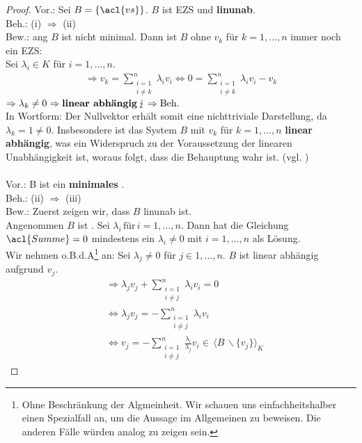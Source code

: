 \begin{proof}  
Vor.: Sei $B = \{\acl{vs}\}$. $B$ ist \acl{EZS} und \textbf{\acl{linunab}}.
\\ Beh.: (i) $\Rightarrow$ (ii) 
\\ Bew.: \acl{ang} $B$ ist nicht minimal. Dann ist $B$ ohne $v_k$ für $k=1,...,n$ immer noch ein \acl{EZS}:
\\ Sei $\lambda_i \in K$ für $i=1,...,n$.
\begin{align*}\Rightarrow v_k = \sum \limits_{\substack{i=1\\i\not=k}}^{n}\lambda_i v_i
\Leftrightarrow 0 = \sum \limits_{\substack{i=1\\i\not=k}}^{n}\lambda_i v_i - v_k 
\end{align*}
\(\Rightarrow \lambda_k \not= 0 \Rightarrow \text{\textbf{linear abhängig}} \, \lightning
\Rightarrow \text{Beh.} \)
\\In Wortform: Der Nullvektor erhält somit eine nichttriviale Darstellung, da $\lambda_k=1\not=0$. Insbesondere ist das System $B$ mit $v_k$ für $k=1,...,n$ \textbf{linear abhängig}, was ein Widerspruch zu der Voraussetzung der linearen Unabhängigkeit ist, woraus folgt, dass die Behauptung wahr ist. (vgl. \cite[S. 41, 9.16 (a) $\Rightarrow$ (b)]{Skript})
\\
\\ Vor.: B ist ein \textbf{minimales }.
\\ Beh.: (ii) $\Rightarrow$ (iii) 
\\ Bew.: Zuerst zeigen wir, dass $B$ \acl{linunab} ist.
\\ Angenommen $B$ ist . Sei \(\lambda_i \, \text{für} \, i=1,...,n\). Dann hat die Gleichung \(\acl{Summe}=0\) mindestens ein $\lambda_i\not=0$ mit $i=1,...,n$ als Lösung.
\\Wir nehmen o.B.d.A\footnote{Ohne Beschränkung der Algmeinheit. Wir schauen uns einfachheitshalber einen Spezialfall an, um die Aussage im Allgemeinen zu beweisen. Die anderen Fälle würden analog zu zeigen sein.} an:
Sei $\lambda_j \not= 0$ für $j \in {1,...,n}$. $B$ ist linear abhängig aufgrund $v_j$. 
\begin{align*}
&\Rightarrow \lambda_j v_j + \sum\limits_{\substack{i=1\\i\not=j}}^{n} \lambda_i v_i = 0
\\ &\Leftrightarrow \lambda_j v_j = - \sum\limits_{\substack{i=1\\i\not=j}}^{n} \lambda_i v_i
\\ &\Leftrightarrow v_j = - \sum\limits_{\substack{i=1\\i\not=j}}^{n} \frac{\lambda_i}{\lambda_j} v_i \in\, \langle B\, \backslash \{v_j\}\rangle_K

\end{align*}
\end{proof}
